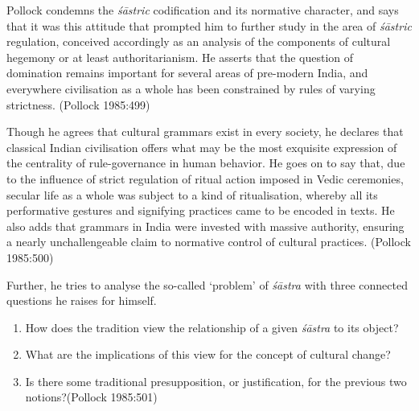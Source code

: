 Pollock condemns the {\sl śāstric} codification and its normative character, and says that it was this attitude that prompted him to further study in the area of {\sl śāstric} regulation, conceived accordingly as an analysis of the components of cultural hegemony or at least authoritarianism. He asserts that the question of domination remains important for several areas of pre-modern India, and everywhere civilisation as a whole has been constrained by rules of varying strictness. (Pollock 1985:499)

Though he agrees that cultural grammars exist in every society, he declares that classical Indian civilisation offers what may be the most exquisite expression of the centrality of rule-governance in human behavior. He goes on to say that, due to the influence of strict regulation of ritual action imposed in Vedic ceremonies, secular life as a whole was subject to a kind of ritualisation, whereby all its performative gestures and signifying practices came to be encoded in texts. He also adds that grammars in India were invested with massive authority, ensuring a nearly unchallengeable claim to normative control of cultural practices. (Pollock 1985:500)

Further, he tries to analyse the so-called `problem' of {\sl śāstra} with three connected questions he raises for himself.
\begin{enumerate}
\item How does the tradition view the relationship of a given {\sl śāstra} to its object?

\item What are the implications of this view for the concept of cultural change?

\item Is there some traditional presupposition, or justification, for the previous two notions?\hfill (Pollock 1985:501)
\end{enumerate}

